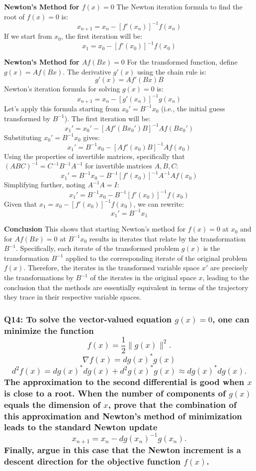 \documentclass[8pt]{article}
\begin{document}
\textbf{Newton's Method for \( f(x) = 0 \)}
The Newton iteration formula to find the root of \( f(x) = 0 \) is:
\[
x_{n+1} = x_n - [f'(x_n)]^{-1} f(x_n)
\]
If we start from \( x_0 \), the first iteration will be:
\[
x_1 = x_0 - [f'(x_0)]^{-1} f(x_0)
\]

\textbf{Newton's Method for \( Af(Bx) = 0 \)}
For the transformed function, define \( g(x) = Af(Bx) \). The derivative \( g'(x) \) using the chain rule is:
\[
g'(x) = A f'(Bx) B
\]
Newton's iteration formula for solving \( g(x) = 0 \) is:
\[
x_{n+1} = x_n - [g'(x_n)]^{-1} g(x_n)
\]
Let's apply this formula starting from \( x_0' = B^{-1} x_0 \) (i.e., the initial guess transformed by \( B^{-1} \)). The first iteration will be:
\[
x_1' = x_0' - [A f'(Bx_0') B]^{-1} Af(Bx_0')
\]
Substituting \( x_0' = B^{-1} x_0 \) gives:
\[
x_1' = B^{-1} x_0 - [A f'(x_0) B]^{-1} Af(x_0)
\]
Using the properties of invertible matrices, specifically that \( (ABC)^{-1} = C^{-1}B^{-1}A^{-1} \) for invertible matrices \( A, B, C \):
\[
x_1' = B^{-1} x_0 - B^{-1}[f'(x_0)]^{-1}A^{-1} Af(x_0)
\]
Simplifying further, noting \( A^{-1}A = I \):
\[
x_1' = B^{-1} x_0 - B^{-1}[f'(x_0)]^{-1} f(x_0)
\]
Given that \( x_1 = x_0 - [f'(x_0)]^{-1} f(x_0) \), we can rewrite:
\[
x_1' = B^{-1} x_1
\]

\textbf{Conclusion}
This shows that starting Newton's method for \( f(x) = 0 \) at \( x_0 \) and for \( Af(Bx) = 0 \) at \( B^{-1} x_0 \) results in iterates that relate by the transformation \( B^{-1} \). Specifically, each iterate of the transformed problem \( g(x) \) is the transformation \( B^{-1} \) applied to the corresponding iterate of the original problem \( f(x) \). Therefore, the iterates in the transformed variable space \( x' \) are precisely the transformations by \( B^{-1} \) of the iterates in the original space \( x \), leading to the conclusion that the methods are essentially equivalent in terms of the trajectory they trace in their respective variable spaces.

\subsubsection*{Q14: To solve the vector-valued equation \(g(x) = 0\), one can minimize the function
\[ f(x) = \frac{1}{2} \|g(x)\|^2. \]
\[ \nabla f(x) = dg(x)^* g(x) \]
\[ d^2 f(x) = dg(x)^* dg(x) + d^2 g(x)^* g(x) \approx dg(x)^* dg(x). \]
The approximation to the second differential is good when \(x\) is close to a root. When the number of components of \(g(x)\) equals the dimension of \(x\), prove that the combination of this approximation and Newton’s method of minimization leads to the standard Newton update
\[ x_{n+1} = x_n - dg(x_n)^{-1} g(x_n). \]
Finally, argue in this case that the Newton increment is a descent direction for the objective function \(f(x)\).}
\end{document}
